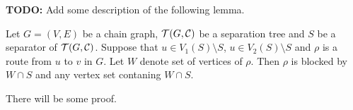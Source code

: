 %
%
%
%

\textbf{TODO:} Add some description of the following lemma.

\begin{lemma}
	Let $G = (V, E)$ be a chain graph, $\mathcal{T}(G, \mathcal{C})$ be a separation tree and $S$ be a separator of $\mathcal{T}(G, \mathcal{C})$.
	Suppose that $u \in V_1(S) \setminus S$, $u \in V_2(S) \setminus S$ and $\rho$ is a route from $u$ to $v$ in $G$. Let $W$ denote
	set of vertices of $\rho$. Then $\rho$ is blocked by $W \cap S$ and any vertex set contaning $W \cap S$.
\end{lemma}

\begin{prf}
	There will be some proof.
	\QED
\end{prf}


